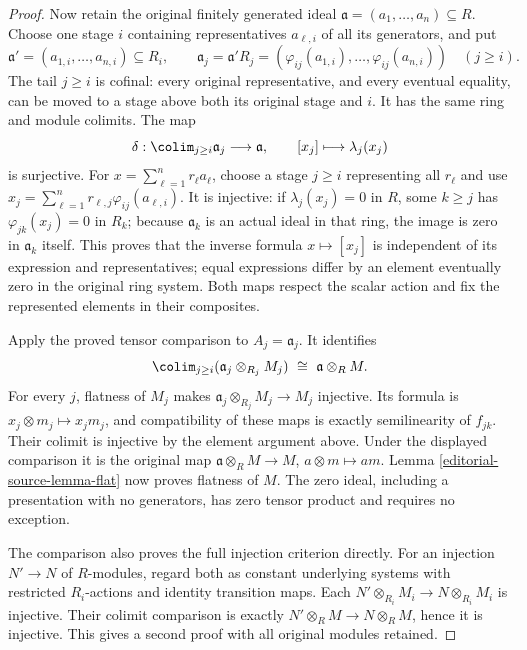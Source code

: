 \begin{proof}
Now retain the original finitely generated ideal
$\mathfrak a=(a_1,\ldots,a_n)\subseteq R$. Choose one stage
$i$ containing representatives $a_{\ell,i}$ of all its
generators, and put
$$
\mathfrak a'=(a_{1,i},\ldots,a_{n,i})\subseteq R_i,
\qquad
\mathfrak a_j=\mathfrak a'R_j
=(\varphi_{ij}(a_{1,i}),\ldots,\varphi_{ij}(a_{n,i}))
\quad(j\geq i).
$$
The tail $j\geq i$ is cofinal: every original representative,
and every eventual equality, can be moved to a stage above
both its original stage and $i$. It has the same ring and
module colimits. The map
$$
\delta:\colim_{j\geq i}\mathfrak a_j\longrightarrow\mathfrak a,
\qquad [x_j]\longmapsto\lambda_j(x_j)
$$
is surjective. For $x=\sum_{\ell=1}^n r_\ell a_\ell$,
choose a stage $j\geq i$ representing all $r_\ell$ and use
$x_j=\sum_{\ell=1}^n r_{\ell,j}\varphi_{ij}(a_{\ell,i})$.
It is injective: if $\lambda_j(x_j)=0$ in $R$, some
$k\geq j$ has $\varphi_{jk}(x_j)=0$ in $R_k$; because
$\mathfrak a_k$ is an actual ideal in that ring, the image
is zero in $\mathfrak a_k$ itself. This proves that the
inverse formula $x\mapsto[x_j]$ is independent of its
expression and representatives; equal expressions differ
by an element eventually zero in the original ring system.
Both maps respect the scalar action and fix the represented
elements in their composites.

Apply the proved tensor comparison to $A_j=\mathfrak a_j$.
It identifies
$$
\colim_{j\geq i}(\mathfrak a_j\otimes_{R_j}M_j)
\ \cong\ \mathfrak a\otimes_R M.
$$
For every $j$, flatness of $M_j$ makes
$\mathfrak a_j\otimes_{R_j}M_j\to M_j$ injective. Its
formula is $x_j\otimes m_j\mapsto x_jm_j$, and compatibility
of these maps is exactly semilinearity of $f_{jk}$.
Their colimit is injective by the element argument above.
Under the displayed comparison it is the original map
$\mathfrak a\otimes_R M\to M$, $a\otimes m\mapsto am$.
Lemma \ref{editorial-source-lemma-flat} now proves flatness of $M$.
The zero ideal, including a presentation with no generators,
has zero tensor product and requires no exception.

The comparison also proves the full injection criterion
directly. For an injection $N'\to N$ of $R$-modules, regard
both as constant underlying systems with restricted
$R_i$-actions and identity transition maps. Each
$N'\otimes_{R_i}M_i\to N\otimes_{R_i}M_i$ is injective.
Their colimit comparison is exactly
$N'\otimes_R M\to N\otimes_R M$, hence it is injective.
This gives a second proof with all original modules retained.


\end{proof}

